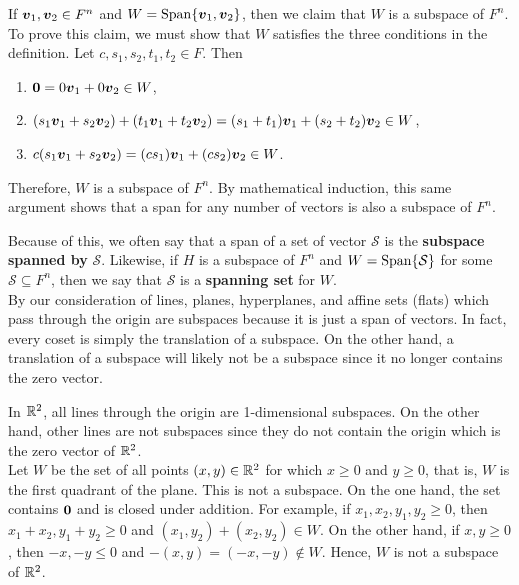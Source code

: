 \begin{Exam}\label{exam:spansubspace}
If $\boldsymbol v_1, \boldsymbol v_2 \in F^n$ and $W = \operatorname{Span}\{\boldsymbol v_1, \boldsymbol v_2\}$, then we claim that $W$ is a subspace of $F^n$. To prove this claim, we must show that $W$ satisfies the three conditions in the definition. Let $c, s_1, s_2, t_1, t_2 \in F$. Then
\begin{enumerate}[!THM!, start =1]
\item $\boldsymbol 0 = 0\boldsymbol v_1 + 0\boldsymbol v_2 \in W$,
\item $(s_1\boldsymbol v_1 + s_2\boldsymbol v_2) + (t_1\boldsymbol v_1 + t_2\boldsymbol v_2) = (s_1+t_1)\boldsymbol v_1 + (s_2+t_2)\boldsymbol v_2 \in W$,
\item $c(s_1\boldsymbol v_1 + s_2\boldsymbol v_2) = (cs_1)\boldsymbol v_1 + (cs_2)\boldsymbol v_2 \in W$.
\end{enumerate} Therefore, $W$ is a subspace of $F^n$. By mathematical induction, this same argument shows that a span for any number of vectors is also a subspace of $F^n$.
\end{Exam}\vs

Because of this, we often say that a span of a set of vector $\mathcal{S}$ is the \textbf{subspace spanned by} $\mathcal{S}$. Likewise, if $H$ is a subspace of $F^n$ and $W = \operatorname{Span}\{\mathcal{S}\}$ for some $\mathcal{S}\subseteq F^n$, then we say that $\mathcal{S}$ is a \textbf{spanning set} for $W$.\\

By our consideration of lines, planes, hyperplanes, and affine sets (flats) which pass through the origin are subspaces because it is just a span of vectors. In fact, every coset is simply the translation of a subspace. On the other hand, a translation of a subspace will likely not be a subspace since it no longer contains the zero vector.\\

\begin{Exam} In $\mathbb{R}^2$, all lines through the origin are 1-dimensional subspaces. On the other hand, other lines are not subspaces since they do not contain the origin which is the zero vector of $\mathbb{R}^2$.\\

Let $W$ be the set of all points $(x,y)\in \mathbb{R}^2$ for which $x\ge 0$ and $y\ge 0$, that is, $W$ is the first quadrant of the plane. This is not a subspace. On the one hand, the set contains $\boldsymbol 0$ and is closed under addition. For example, if $x_1, x_2, y_1, y_2\ge 0$, then $x_1+x_2, y_1+y_2\ge 0$ and $(x_1,y_2) + (x_2,y_2) \in W$. On the other hand, if $x, y\ge 0$, then $-x,-y\le 0$ and $-(x,y) = (-x,-y) \notin W$. Hence, $W$ is not a subspace of $\mathbb{R}^2$.
\end{Exam}\vs

